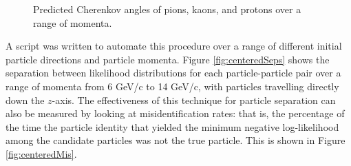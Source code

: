 \begin{figure}[]
\centering
{}
\caption[Predicted Cherenkov angles of pions, kaons, and protons over a range of momenta.]{Predicted Cherenkov angles of pions, kaons, and protons over a range of momenta.}
\label{fig:changles}
\end{figure}


A script was written to automate this procedure over a range of different initial particle directions and particle momenta. 
Figure \ref{fig:centeredSeps} shows the separation between likelihood distributions for each particle-particle pair over a range of momenta from 6 GeV/c to 14 GeV/c, with particles travelling directly down the $z$-axis.
The effectiveness of this technique for particle separation can also be measured by looking at misidentification rates: that is, the percentage of the time the particle identity that yielded the minimum negative log-likelihood among the candidate particles was not the true particle.
This is shown in Figure \ref{fig:centeredMis}.


